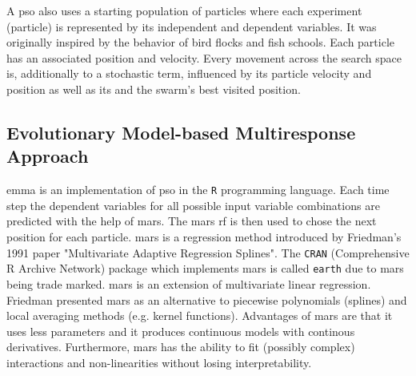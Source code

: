 A \gls{pso} also uses a starting population of particles where each experiment (particle) 
is represented by its independent and dependent variables. 
It was originally inspired by the behavior of bird flocks and fish schools\cite{villanova2010function,Kennedy1995}.
Each particle has an associated position and velocity. 
Every movement across the search space is, 
additionally to a stochastic term, 
influenced by its particle velocity and position as well as its and the swarm's best visited position.


\subsection{Evolutionary Model-based Multiresponse Approach}
\Gls{emma} is an implementation of \gls{pso} in the \texttt{R} programming language. 
Each time step the dependent variables for all possible input variable combinations %
are predicted with the help of \gls{mars}. 
The \gls{mars} \gls{rf} is then used to chose the next position for each particle.
\Gls{mars} is a regression method introduced by Friedman's 1991 paper 
"Multivariate Adaptive Regression Splines"\cite{friedman1991multivariate}. 
The \texttt{CRAN} (Comprehensive R Archive Network) package which implements \gls{mars} is called \texttt{earth} due to \gls{mars} being trade marked\cite{mars}.
\gls{mars} is an extension of multivariate linear regression.
Friedman presented \gls{mars} as an alternative to piecewise polynomials (splines) and local averaging methods (e.g. kernel functions). %
Advantages of \Gls{mars} are that it uses less parameters and it produces continuous models with continous derivatives.
%
%
Furthermore, \gls{mars} has the ability to fit (possibly complex) interactions and non-linearities without losing interpretability. 
%
%

